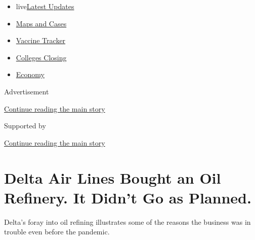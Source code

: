 \begin{itemize}
\tightlist
\item
  live\href{https://www.nytimes3xbfgragh.onion/2020/08/20/world/coronavirus-covid.html?name=styln-coronavirus-markets\&region=TOP_BANNER\&variant=undefined\&block=storyline_menu_recirc\&action=click\&pgtype=Article\&impression_id=1354e361-e384-11ea-99fe-1fe62c0779f3}{Latest
  Updates}
\item
  \href{https://www.nytimes3xbfgragh.onion/interactive/2020/us/coronavirus-us-cases.html?name=styln-coronavirus-markets\&region=TOP_BANNER\&variant=undefined\&block=storyline_menu_recirc\&action=click\&pgtype=Article\&impression_id=1354e362-e384-11ea-99fe-1fe62c0779f3}{Maps
  and Cases}
\item
  \href{https://www.nytimes3xbfgragh.onion/interactive/2020/science/coronavirus-vaccine-tracker.html?name=styln-coronavirus-markets\&region=TOP_BANNER\&variant=undefined\&block=storyline_menu_recirc\&action=click\&pgtype=Article\&impression_id=1354e363-e384-11ea-99fe-1fe62c0779f3}{Vaccine
  Tracker}
\item
  \href{https://www.nytimes3xbfgragh.onion/2020/08/19/us/colleges-closing-covid.html?name=styln-coronavirus-markets\&region=TOP_BANNER\&variant=undefined\&block=storyline_menu_recirc\&action=click\&pgtype=Article\&impression_id=1354e364-e384-11ea-99fe-1fe62c0779f3}{Colleges
  Closing}
\item
  \href{https://www.nytimes3xbfgragh.onion/live/2020/08/20/business/stock-market-today-coronavirus?name=styln-coronavirus-markets\&region=TOP_BANNER\&variant=undefined\&block=storyline_menu_recirc\&action=click\&pgtype=Article\&impression_id=1354e365-e384-11ea-99fe-1fe62c0779f3}{Economy}
\end{itemize}

Advertisement

\protect\hyperlink{after-top}{Continue reading the main story}

Supported by

\protect\hyperlink{after-sponsor}{Continue reading the main story}

\hypertarget{delta-air-lines-bought-an-oil-refinery-it-didnt-go-as-planned}{%
\section{Delta Air Lines Bought an Oil Refinery. It Didn't Go as
Planned.}\label{delta-air-lines-bought-an-oil-refinery-it-didnt-go-as-planned}}

Delta's foray into oil refining illustrates some of the reasons the
business was in trouble even before the pandemic.

